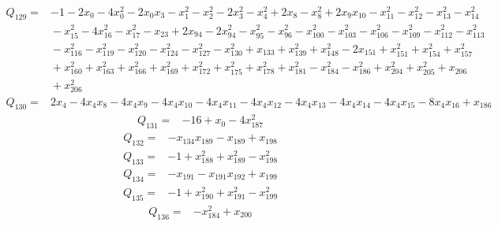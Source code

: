 \documentclass[11pt]{article}
\theoremstyle{definition}\newtheorem{definition}[theorem]{Definition}
\begin{document}
{\begin{align*}
\end{align*}
\begin{align*}
 Q_{129}={}&-1 -2x_{0} -4x_{0}^{2} -2x_{0}x_{3} -x_{1}^{2} -x_{2}^{2} -2x_{3}^{2} -x_{4}^{2} +2x_{8} -x_{8}^{2} +2x_{9}x_{10} -x_{11}^{2} -x_{12}^{2} -x_{13}^{2} -x_{14}^{2}\\
 &{}-x_{15}^{2} -4x_{16}^{2} -x_{17}^{2} -x_{23} +2x_{94} -2x_{94}^{2} -x_{95}^{2} -x_{96}^{2} -x_{100}^{2} -x_{103}^{2} -x_{106}^{2} -x_{109}^{2} -x_{112}^{2} -x_{113}^{2}\\
 &{}-x_{116}^{2} -x_{119}^{2} -x_{120}^{2} -x_{124}^{2} -x_{127}^{2} -x_{130}^{2} +x_{133} +x_{139}^{2} +x_{148}^{2} -2x_{151} +x_{151}^{2} +x_{154}^{2} +x_{157}^{2}\\
 &{}+x_{160}^{2} +x_{163}^{2} +x_{166}^{2} +x_{169}^{2} +x_{172}^{2} +x_{175}^{2} +x_{178}^{2} +x_{181}^{2} -x_{184}^{2} -x_{186}^{2} +x_{204}^{2} +x_{205}^{2} +x_{206}\\
 &{}+x_{206}^{2}
\end{align*}
\begin{align*}
 Q_{130}={}&2x_{4} -4x_{4}x_{8} -4x_{4}x_{9} -4x_{4}x_{10} -4x_{4}x_{11} -4x_{4}x_{12} -4x_{4}x_{13} -4x_{4}x_{14} -4x_{4}x_{15} -8x_{4}x_{16} +x_{186}
\end{align*}
\begin{align*}
 Q_{131}={}&-16 +x_{0} -4x_{187}^{2}
\end{align*}
\begin{align*}
 Q_{132}={}&-x_{134}x_{189} -x_{189} +x_{198}
\end{align*}
\begin{align*}
 Q_{133}={}&-1 +x_{188}^{2} +x_{189}^{2} -x_{198}^{2}
\end{align*}
\begin{align*}
 Q_{134}={}&-x_{191} -x_{191}x_{192} +x_{199}
\end{align*}
\begin{align*}
 Q_{135}={}&-1 +x_{190}^{2} +x_{191}^{2} -x_{199}^{2}
\end{align*}
\begin{align*}
 Q_{136}={}&-x_{184}^{2} +x_{200}
\end{align*}
\begin{align*}

\end{align*}}
\end{document}
